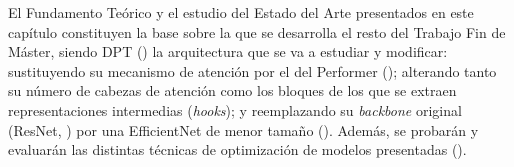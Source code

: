 El Fundamento Teórico y el estudio del Estado del Arte presentados en este capítulo constituyen la base sobre la que se desarrolla el resto del Trabajo Fin de Máster, siendo DPT () la arquitectura que se va a estudiar y modificar: sustituyendo su mecanismo de atención por el del Performer (); alterando tanto su número de cabezas de atención como los bloques de los que se extraen representaciones intermedias (\textit{hooks}); y reemplazando su \textit{backbone} original (ResNet, ) por una EfficientNet de menor tamaño (). Además, se probarán y evaluarán las distintas técnicas de optimización de modelos presentadas ().

\clearpage
